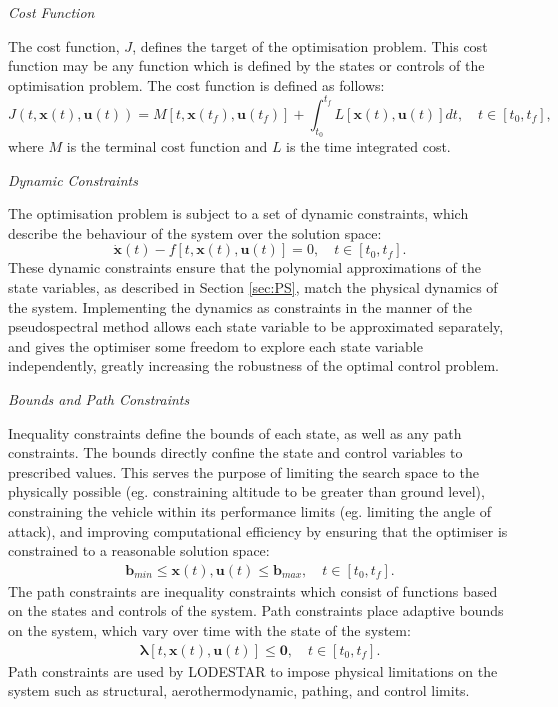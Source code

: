 \noindent \textit{Cost Function}

\noindent The cost function, $J$, defines the target of the optimisation problem. 
This cost function may be any function which is defined by the states or controls of the optimisation problem. The cost function is defined as follows:
\begin{equation} \label{eq:cost}
J(t,\textbf{x}(t),\textbf{u}(t)) = M[t,\textbf{x}(t_f),\textbf{u}(t_f)] +   \int_{t_0}^{t_f} L[\textbf{x}(t),\textbf{u}(t)] dt, \quad t \in [t_0,t_f],
\end{equation}
where $M$ is the terminal cost function and $L$ is the time integrated cost. 

\noindent \textit{Dynamic Constraints}

\noindent 
The optimisation problem is subject to a set of dynamic constraints, which describe the behaviour of the system over the solution space:
\begin{equation} \label{eq:state}
\dot{\textbf{x}}(t) - f[t,\textbf{x}(t),\textbf{u}(t)] = 0, \quad t \in [t_0,t_f].
\end{equation}
These dynamic constraints ensure that the polynomial approximations of the state variables, as described in Section \ref{sec:PS}, match the physical dynamics of the system. Implementing the dynamics as constraints in the manner of the pseudospectral method allows each state variable to be approximated separately, and gives the optimiser some freedom to explore each state variable independently, greatly increasing the robustness of the optimal control problem.



\noindent \textit{Bounds and Path Constraints}

\noindent Inequality constraints define the bounds of each state, as well as any path constraints.
The bounds directly confine the state and control variables to prescribed values. This serves the purpose of limiting the search space to the physically possible (eg. constraining altitude to be greater than ground level), constraining the vehicle within its performance limits (eg. limiting the angle of attack), and improving computational efficiency by ensuring that the optimiser is constrained to a reasonable solution space:
\begin{eqnarray}
\mathbf{b}_{min} \leq \textbf{x}(t),\textbf{u}(t) \leq \mathbf{b}_{max}, \quad t \in [t_0,t_f].
\end{eqnarray}
The path constraints are inequality constraints which consist of functions based on the states and controls of the system. Path constraints place adaptive bounds on the system, which vary over time with the state of the system:
\begin{eqnarray}
\mathbf{\lambda}[t,\textbf{x}(t),\textbf{u}(t)] \leq \textbf{0}, \quad t \in [t_0,t_f].
\end{eqnarray}
Path constraints are used by LODESTAR to impose physical limitations on the system such as structural, aerothermodynamic, pathing, and control limits.

